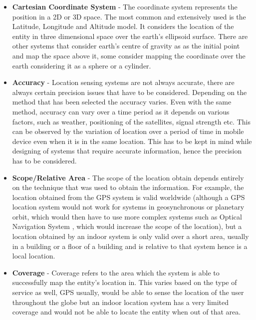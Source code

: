 \documentclass[12pt]{report}
\begin{document}
\begin{itemize}
\item \textbf{Cartesian Coordinate System} - The coordinate system represents the position in a 2D or 3D space. The most common and extensively used is the Latitude, Longitude and Altitude model. It considers the location of the entity in three dimensional space over the earth's ellipsoid surface. There are other systems that consider earth's centre of gravity as as the initial point and map the space above it, some consider mapping the coordinate over the earth considering it as a sphere or a cylinder.

\item \textbf{Accuracy} - Location sensing systems are not always accurate, there are always certain precision issues that have to be considered. Depending on the method that has been selected the accuracy varies. Even with the same method, accuracy can vary over a time period as it depends on various factors, such as weather, positioning of the satellites, signal strength etc. This can be observed by the variation of location over a period of time in mobile device even when it is in the same location. This has to be kept in mind while designing of systems that require accurate information, hence the precision has to be considered.

\item \textbf{Scope/Relative Area} - The scope of the location obtain depends entirely on the technique that was used to obtain the information. For example, the location obtained from the GPS system is valid worldwide (although a GPS location system would not work for systems in geosynchronous or planetary orbit, which would then have to use more complex systems such as Optical Navigation System \cite{rathbone1988optical}, which would increase the scope of the location), but a location obtained by an indoor system is only valid over a short area, usually in a building or a floor of a building and is relative to that system hence is a local location.


\item \textbf{Coverage} - Coverage refers to the area which the system is able to successfully map the entity's location in. This varies based on the type of service as well, GPS usually, would be able to sense the location of the user throughout the globe but an indoor location system has a very limited coverage and would not be able to locate the entity when out of that area.
\end{itemize}
\end{document}
